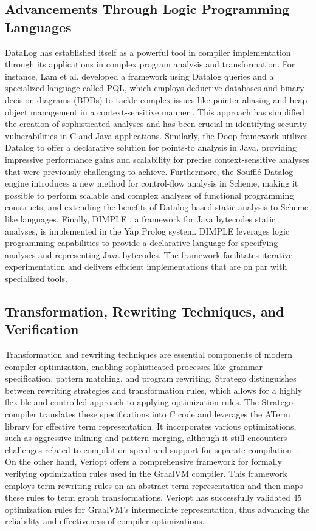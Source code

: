 \subsection{Advancements Through Logic Programming Languages}
DataLog has established itself as a powerful tool in compiler implementation through its applications in complex program analysis and transformation. For instance, Lam et al. developed a framework using Datalog queries and a specialized language called PQL, which employs deductive databases and binary decision diagrams (BDDs) to tackle complex issues like pointer aliasing and heap object management in a context-sensitive manner \cite{Lam2005}. This approach has simplified the creation of sophisticated analyses and has been crucial in identifying security vulnerabilities in C and Java applications. Similarly, the Doop framework \cite{Bravenboer2009} utilizes Datalog to offer a declarative solution for points-to analysis in Java, providing impressive performance gains and scalability for precise context-sensitive analyses that were previously challenging to achieve. Furthermore, the Soufflé Datalog engine \cite{silverman2021wantanalyzeschemeprograms} introduces a new method for control-flow analysis in Scheme, making it possible to perform scalable and complex analyses of functional programming constructs, and extending the benefits of Datalog-based static analysis to Scheme-like languages. Finally, DIMPLE \cite{Benton2007}, a framework for Java bytecodes static analyses, is implemented in the Yap Prolog system. DIMPLE leverages logic programming capabilities to provide a declarative language for specifying analyses and representing Java bytecodes. The framework facilitates iterative experimentation and delivers efficient implementations that are on par with specialized tools.

\subsection{Transformation, Rewriting Techniques, and Verification}
Transformation and rewriting techniques are essential components of modern compiler optimization, enabling sophisticated processes like grammar specification, pattern matching, and program rewriting. Stratego \cite{Eelco2001} distinguishes between rewriting strategies and transformation rules, which allows for a highly flexible and controlled approach to applying optimization rules. The Stratego compiler translates these specifications into C code and leverages the ATerm library for effective term representation. It incorporates various optimizations, such as aggressive inlining and pattern merging, although it still encounters challenges related to compilation speed and support for separate compilation~\cite{Eelco2001}. On the other hand, Veriopt \cite{Webb2023} offers a comprehensive framework for formally verifying optimization rules used in the GraalVM compiler. This framework employs term rewriting rules on an abstract term representation and then maps these rules to term graph transformations. Veriopt has successfully validated 45 optimization rules for GraalVM’s intermediate representation, thus advancing the reliability and effectiveness of compiler optimizations.

